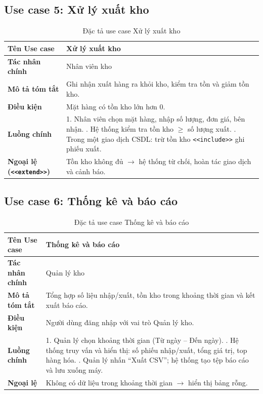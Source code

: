 \documentclass[12pt,a4paper]{report}
\begin{document}
\subsection{Use case 5: Xử lý xuất kho}
\begin{table}[H]
\centering
\renewcommand{\arraystretch}{1.3}
\begin{tabularx}{\textwidth}{|L{3.2cm}|X|}
\hline
\textbf{Tên Use case} & Xử lý xuất kho \\ \hline
\textbf{Tác nhân chính} & Nhân viên kho \\ \hline
\textbf{Mô tả tóm tắt} & Ghi nhận xuất hàng ra khỏi kho, kiểm tra tồn và giảm tồn kho. \\ \hline
\textbf{Điều kiện} & Mặt hàng có tồn kho lớn hơn 0. \\ \hline
\textbf{Luồng chính} &
1. Nhân viên chọn mặt hàng, nhập số lượng, đơn giá, bên nhận. . Hệ thống kiểm tra tồn kho $\geq$ số lượng xuất. . Trong một giao dịch CSDL: trừ tồn kho \texttt{<<include>>} ghi phiếu xuất. \\ \hline
\textbf{Ngoại lệ (\texttt{<<extend>>})} & Tồn kho không đủ $\rightarrow$ hệ thống từ chối, hoàn tác giao dịch và cảnh báo. \\ \hline
\end{tabularx}
\caption{Đặc tả use case Xử lý xuất kho}
\end{table}

\subsection{Use case 6: Thống kê và báo cáo}
\begin{table}[H]
\centering
\renewcommand{\arraystretch}{1.3}
\begin{tabularx}{\textwidth}{|L{3.2cm}|X|}
\hline
\textbf{Tên Use case} & Thống kê và báo cáo \\ \hline
\textbf{Tác nhân chính} & Quản lý kho \\ \hline
\textbf{Mô tả tóm tắt} & Tổng hợp số liệu nhập/xuất, tồn kho trong khoảng thời gian và kết xuất báo cáo. \\ \hline
\textbf{Điều kiện} & Người dùng đăng nhập với vai trò Quản lý kho. \\ \hline
\textbf{Luồng chính} &
1. Quản lý chọn khoảng thời gian (Từ ngày -- Đến ngày). . Hệ thống truy vấn và hiển thị: số phiếu nhập/xuất, tổng giá trị, top hàng hóa. . Quản lý nhấn ``Xuất CSV''; hệ thống tạo tệp báo cáo và lưu xuống máy. \\ \hline
\textbf{Ngoại lệ} & Không có dữ liệu trong khoảng thời gian $\rightarrow$ hiển thị bảng rỗng. \\ \hline
\end{tabularx}
\caption{Đặc tả use case Thống kê và báo cáo}
\end{table}
\end{document}
